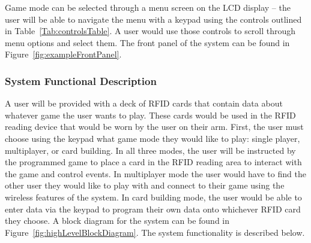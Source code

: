 \documentclass[12pt]{article} %
\begin{document}
Game mode can be selected through a menu screen on the LCD display – the user will be able to navigate the menu with a keypad using the controls outlined in Table~\ref{Tab:controlsTable}.  A user would use those controls to scroll through menu options and select them. The front panel of the system can be found in Figure~\ref{fig:exampleFrontPanel}.

\subsubsection{System Functional Description}\label{sysFunctDesc}

A user will be provided with a deck of RFID cards that contain data about whatever game the user wants to play.  These cards would be used in the RFID reading device that would be worn by the user on their arm.  First, the user must choose using the keypad what game mode they would like to play: single player, multiplayer, or card building.  In all three modes, the user will be instructed by the programmed game to place a card in the RFID reading area to interact with the game and control events. In multiplayer mode the user would have to find the other user they would like to play with and connect to their game using the wireless features of the system.  In card building mode, the user would be able to enter data via the keypad to program their own data onto whichever RFID card they choose.  A block diagram for the system can be found in Figure~\ref{fig:highLevelBlockDiagram}.  The system functionality is described below.
\end{document}
